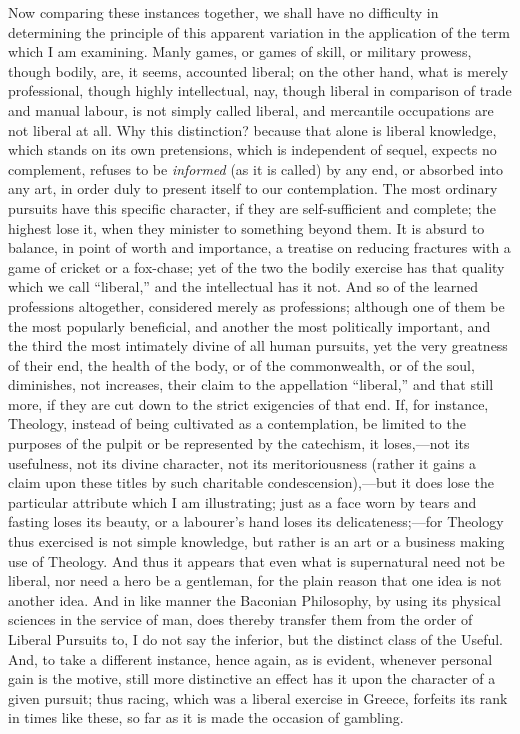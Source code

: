 Now comparing these instances together, we shall have no difficulty
in determining the principle of this apparent variation in the
application of the term which I am examining. Manly games, or games of
skill, or military prowess, though bodily, are, it seems,
accounted liberal; on the other hand, what is merely professional,
though highly intellectual, nay, though liberal in comparison of trade
and manual labour, is not simply called liberal, and mercantile
occupations are not liberal at all. Why this distinction? because that
alone is liberal knowledge, which stands on its own pretensions, which
is independent of sequel, expects no complement, refuses to be \emph{informed}
(as it is called) by any end, or absorbed into any art, in order duly
to present itself to our contemplation. The most ordinary pursuits
have this specific character, if they are self-sufficient and
complete; the highest lose it, when they minister to something beyond
them. It is absurd to balance, in point of worth and importance, a
treatise on reducing fractures with a game of cricket or a fox-chase;
yet of the two the bodily exercise has that quality which we call
``liberal,'' and the intellectual has it not. And so of the
learned professions altogether, considered merely as professions;
although one of them be the most popularly beneficial, and another the
most politically important, and the third the most intimately divine
of all human pursuits, yet the very greatness of their end, the health
of the body, or of the commonwealth, or of the soul, diminishes, not
increases, their claim to the appellation ``liberal,'' and
that still more, if they are cut down to the strict exigencies of that
end. If, for instance, Theology, instead of being cultivated as a
contemplation, be limited to the purposes of the pulpit or be
represented by the catechism, it loses,—not its usefulness, not its
divine character, not its meritoriousness (rather it gains a claim
upon these titles by such charitable condescension),—but it does
lose the particular attribute which I am illustrating; just as a face
worn by tears and fasting loses its beauty, or a labourer's hand
loses its delicateness;—for Theology thus exercised is not simple
knowledge, but rather is an art or a business making use of Theology.
And thus it appears that even what is supernatural need not be
liberal, nor need a hero be a gentleman, for the plain reason that one
idea is not another idea. And in like manner the Baconian Philosophy,
by using its physical sciences in the service of man, does thereby
transfer them from the order of Liberal Pursuits to, I do not say the
inferior, but the distinct class of the Useful. And, to take a
different instance, hence again, as is evident, whenever personal gain
is the motive, still more distinctive an effect has it upon the
character of a given pursuit; thus racing, which was a liberal
exercise in Greece, forfeits its rank in times like these, so far as
it is made the occasion of gambling.

